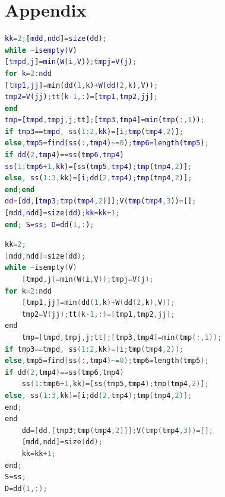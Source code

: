 \documentclass{swmcmthesis}
\begin{document}

\newpage

\section*{Appendix}

\begin{lstlisting}[language=matlab,caption={The matlab Source code of Algorithm}]
kk=2;[mdd,ndd]=size(dd);
while ~isempty(V)
[tmpd,j]=min(W(i,V));tmpj=V(j);
for k=2:ndd
[tmp1,jj]=min(dd(1,k)+W(dd(2,k),V));
tmp2=V(jj);tt(k-1,:)=[tmp1,tmp2,jj];
end
tmp=[tmpd,tmpj,j;tt];[tmp3,tmp4]=min(tmp(:,1));
if tmp3==tmpd, ss(1:2,kk)=[i;tmp(tmp4,2)];
else,tmp5=find(ss(:,tmp4)~=0);tmp6=length(tmp5);
if dd(2,tmp4)==ss(tmp6,tmp4)
ss(1:tmp6+1,kk)=[ss(tmp5,tmp4);tmp(tmp4,2)];
else, ss(1:3,kk)=[i;dd(2,tmp4);tmp(tmp4,2)];
end;end
dd=[dd,[tmp3;tmp(tmp4,2)]];V(tmp(tmp4,3))=[];
[mdd,ndd]=size(dd);kk=kk+1;
end; S=ss; D=dd(1,:);
 \end{lstlisting}
\begin{lstlisting}[language=c,caption={The lingo source code}]
kk=2;
[mdd,ndd]=size(dd);
while ~isempty(V)
    [tmpd,j]=min(W(i,V));tmpj=V(j);
for k=2:ndd
    [tmp1,jj]=min(dd(1,k)+W(dd(2,k),V));
    tmp2=V(jj);tt(k-1,:)=[tmp1,tmp2,jj];
end
    tmp=[tmpd,tmpj,j;tt];[tmp3,tmp4]=min(tmp(:,1));
if tmp3==tmpd, ss(1:2,kk)=[i;tmp(tmp4,2)];
else,tmp5=find(ss(:,tmp4)~=0);tmp6=length(tmp5);
if dd(2,tmp4)==ss(tmp6,tmp4)
    ss(1:tmp6+1,kk)=[ss(tmp5,tmp4);tmp(tmp4,2)];
else, ss(1:3,kk)=[i;dd(2,tmp4);tmp(tmp4,2)];
end;
end
    dd=[dd,[tmp3;tmp(tmp4,2)]];V(tmp(tmp4,3))=[];
    [mdd,ndd]=size(dd);
    kk=kk+1;
end;
S=ss;
D=dd(1,:);
 \end{lstlisting}



\end{document}

